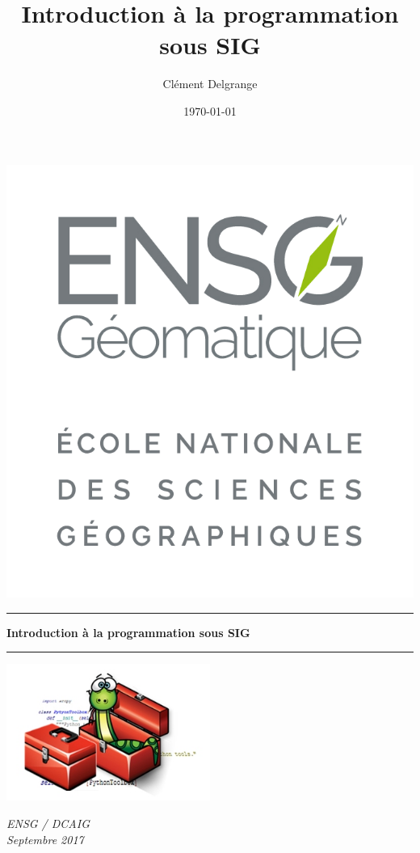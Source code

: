 \documentclass[11pt]{article}
\title{Introduction à la programmation sous SIG}
\author{Clément Delgrange}
\date{\today}
\begin{document}
	
	
\begin{titlepage}
	\begin{sffamily}
		\begin{flushleft}
			\includegraphics[scale=0.15]{img/cours/logo_ensg.png}\\[1.5cm]
		\end{flushleft}
		\begin{flushright}
		\end{flushright}
		
		\vspace{1cm}
		
		\begin{center}
			\hrule
				\vspace{0.5cm}
				{\LARGE \bfseries Introduction à la programmation sous SIG}
				\vspace{0.7cm}
			\hrule
			
			\vspace{3cm}
			\includegraphics[width=0.5\textwidth]{img/cours/img1.jpg}
			\vspace{4cm}
		
			\large \textit{ENSG / DCAIG}\\
			\small \textit{Septembre 2017}
		\end{center}
	\end{sffamily}
\end{titlepage}
\end{document}
